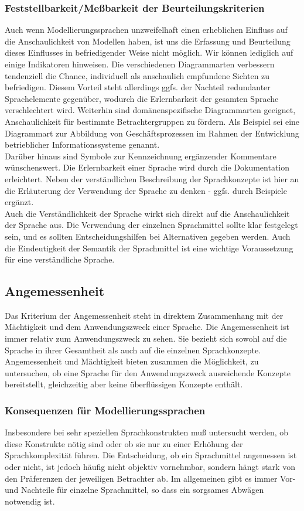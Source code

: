 \subsubsection{Feststellbarkeit/Meßbarkeit der Beurteilungskriterien} 
Auch wenn Modellierungssprachen unzweifelhaft einen erheblichen Einfluss auf die Anschaulichkeit
von Modellen haben, ist uns die Erfassung und Beurteilung dieses Einflusses in befriedigender Weise
nicht möglich. Wir können lediglich auf einige Indikatoren hinweisen. Die verschiedenen Diagrammarten
verbessern tendenziell die Chance, individuell als anschaulich empfundene Sichten zu befriedigen.
Diesem Vorteil steht allerdings ggfs. der Nachteil redundanter Sprachelemente gegenüber,
wodurch die Erlernbarkeit der gesamten Sprache verschlechtert wird. Weiterhin sind domänenspezifische
Diagrammarten geeignet, Anschaulichkeit für bestimmte Betrachtergruppen zu fördern. Als Beispiel
sei eine Diagrammart zur Abbildung von Geschäftsprozessen im Rahmen der Entwicklung
betrieblicher Informationssysteme genannt.
\\
Darüber hinaus sind Symbole zur Kennzeichnung ergänzender Kommentare wünschenswert. Die
Erlernbarkeit einer Sprache wird durch die Dokumentation erleichtert. Neben der verständlichen
Beschreibung der Sprachkonzepte ist hier an die Erläuterung der Verwendung der Sprache zu denken -
ggfs. durch Beispiele ergänzt.\\
Auch die Verständlichkeit der Sprache wirkt sich direkt auf die Anschaulichkeit der Sprache aus. Die
Verwendung der einzelnen Sprachmittel sollte klar festgelegt sein, und es sollten Entscheidungshilfen
bei Alternativen gegeben werden. Auch die Eindeutigkeit der Semantik der Sprachmittel ist eine wichtige
Voraussetzung für eine verständliche Sprache.\\

\subsection{Angemessenheit}
Das Kriterium der Angemessenheit steht in direktem Zusammenhang mit der Mächtigkeit und dem
Anwendungszweck einer Sprache. Die Angemessenheit ist immer relativ zum Anwendungszweck zu
sehen. Sie bezieht sich sowohl auf die Sprache in ihrer Gesamtheit als auch auf die einzelnen Sprachkonzepte.
Angemessenheit und Mächtigkeit bieten zusammen die Möglichkeit, zu untersuchen, ob
eine Sprache für den Anwendungszweck ausreichende Konzepte bereitstellt, gleichzeitig aber keine
überflüssigen Konzepte enthält.
\subsubsection{Konsequenzen für Modellierungssprachen}
Insbesondere bei sehr speziellen Sprachkonstrukten muß untersucht werden, ob diese Konstrukte nötig
sind oder ob sie nur zu einer Erhöhung der Sprachkomplexität führen. Die Entscheidung, ob ein
Sprachmittel angemessen ist oder nicht, ist jedoch häufig nicht objektiv vornehmbar, sondern hängt
stark von den Präferenzen der jeweiligen Betrachter ab. Im allgemeinen gibt es immer Vor- und Nachteile
für einzelne Sprachmittel, so dass ein sorgsames Abwägen notwendig ist.
